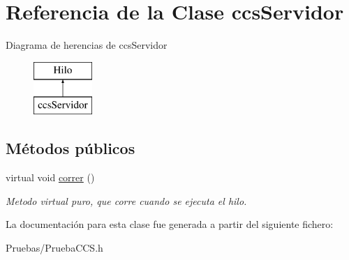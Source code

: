 \hypertarget{classccsServidor}{\section{\-Referencia de la \-Clase ccs\-Servidor}
\label{classccsServidor}
}
\-Diagrama de herencias de ccs\-Servidor\begin{figure}[H]
\begin{center}
\leavevmode
\includegraphics[height=2.000000cm]{classccsServidor}
\end{center}
\end{figure}
\subsection*{\-Métodos públicos}
\begin{DoxyCompactItemize}
\item 
\hypertarget{classccsServidor_adb932252cd6a818744a3017dfbcc0605}{virtual void \hyperlink{classccsServidor_adb932252cd6a818744a3017dfbcc0605}{correr} ()}\label{classccsServidor_adb932252cd6a818744a3017dfbcc0605}

\begin{DoxyCompactList}\small\item\em \-Metodo virtual puro, que corre cuando se ejecuta el hilo. \end{DoxyCompactList}\end{DoxyCompactItemize}


\-La documentación para esta clase fue generada a partir del siguiente fichero\-:\begin{DoxyCompactItemize}
\item 
\-Pruebas/\-Prueba\-C\-C\-S.\-h\end{DoxyCompactItemize}
